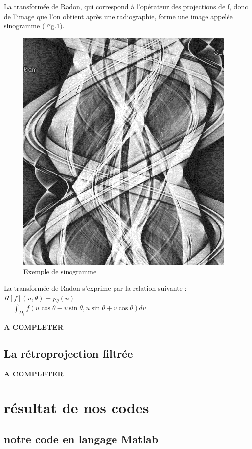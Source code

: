 \documentclass[conference]{IEEEtran}
\begin{document}
La transformée de Radon, qui correspond à l'opérateur des projections de f, donc de l'image que l'on obtient après une radiographie, forme une image appelée sinogramme (Fig.1). 

\begin{figure}[H]
\centering
\includegraphics[scale=0.4]{sinogrammeExemple}
\caption[Exemple de sinogramme]{Exemple de sinogramme}
\label{fig:gallery}
\end{figure}

La transformée de Radon s'exprime par la relation suivante :
$R[f](u,\theta)=p_\theta(u)$
\\%
$=\int_{D_\theta} f(u\cos\theta-v\sin\theta, u\sin\theta+v\cos\theta)dv$

\textbf{A COMPLETER}

\subsection{La rétroprojection filtrée}

\textbf{A COMPLETER}


\section{résultat de nos codes}

\subsection{notre code en langage Matlab}
\end{document}
